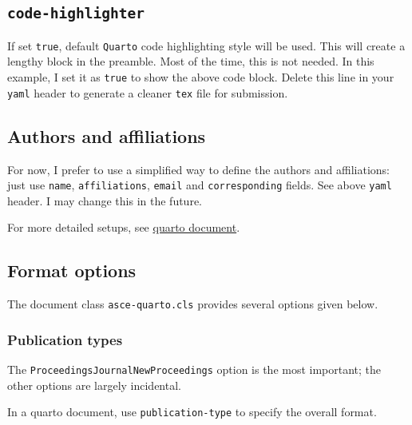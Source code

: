 \documentclass[Journal,LineNumbers]{ascelike-new}
\begin{document}
\subsection{\texorpdfstring{\texttt{code-highlighter}}{code-highlighter}}\label{code-highlighter}

If set \texttt{true}, default \texttt{Quarto} code highlighting style
will be used. This will create a lengthy block in the preamble. Most of
the time, this is not needed. In this example, I set it as \texttt{true}
to show the above code block. Delete this line in your \texttt{yaml}
header to generate a cleaner \texttt{tex} file for submission.

\subsection{Authors and affiliations}\label{authors-and-affiliations}

For now, I prefer to use a simplified way to define the authors and
affiliations: just use \texttt{name}, \texttt{affiliations},
\texttt{email} and \texttt{corresponding} fields. See above
\texttt{yaml} header. I may change this in the future.

For more detailed setups, see
\href{https://quarto.org/docs/journals/authors.html}{quarto document}.

\subsection{Format options}\label{format-options}

The document class \texttt{asce-quarto.cls} provides several options
given below.

\subsubsection{Publication types}\label{publication-types}

The \texttt{Proceedings\textbar{}Journal\textbar{}NewProceedings} option
is the most important; the other options are largely incidental.

In a quarto document, use \texttt{publication-type} to specify the
overall format.
\end{document}
